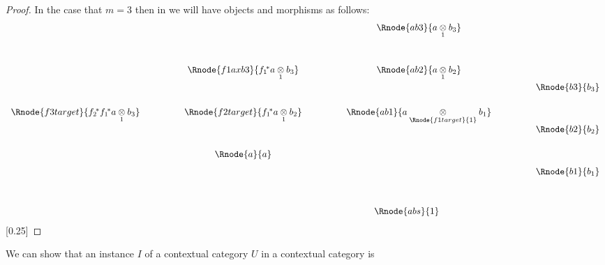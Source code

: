 {\begin{proof}
In the case that $m=3$  then in \catcw we will have objects and morphisms as follows:
\begin{displaymath}
\begin{array}{c p{1cm} c p {1cm} c  p{1cm} c}
                                                &&                                           && \Rnode{ab3}{\crossx{a}{b_3}{1}}                       \\[1.2cm]
                                                &&\Rnode{f1axb3}{\fonestar\crossx{a}{b_3}{1}}  && \Rnode{ab2}{\crossx{a}{b_2}{1}}                       \\[1.2cm]
 \Rnode{f3target}{\ftwostar\fonestar\crossx{a}{b_3}{1}} &&\Rnode{f2target}{\fonestar\crossx{a}{b_2}{1}}  && \Rnode{ab1}{\crossx{a}{b_1}{\Rnode{f1target}{1}}}     \\[1.2cm]
                                                &&\Rnode{a}{a}                               &&                                                       \\[-3.0cm]
																								&&                                           &&                         && \Rnode{b3}{b_3}             \\[1.2cm]
																								&&                                           &&                         && \Rnode{b2}{b_2}             \\[1.2cm]
																								&&                                           &&                         && \Rnode{b1}{b_1}             \\[1.1cm]
																								&&                                           && \Rnode{abs}{1} \ \ \ \ \ \ \ \ &&    
\end{array}
\end{displaymath}
[0.25]
\end{proof}
} %
\newpage
\note
We can show that an instance $I$ of a contextual category $U$ in a contextual category \catcw is
